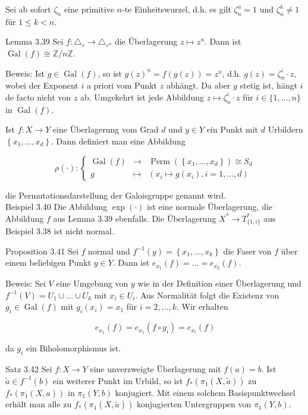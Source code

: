 \documentclass[10pt, letterpaper]{article}
\begin{document}
Sei ab sofort $\zeta_{n}$ eine primitive $n$-te Einheitswurzel, d.h. es gilt $\zeta_{n}^{n}=1$ und $\zeta_{n}^{k} \neq 1$ für $1 \leq k<n$.

Lemma 3.39 Sei $f: \triangle_{\varepsilon} \rightarrow \triangle_{\varepsilon^{n}}$ die Überlagerung $z \mapsto z^{n}$. Dann ist $\operatorname{Gal}(f) \cong \mathbb{Z} / n \mathbb{Z}$.

Beweis: Ist $g \in \operatorname{Gal}(f)$, so ist $g(z)^{n}=f(g(z))=z^{n}$, d.h. $g(z)=\zeta_{n}^{i} \cdot z$, wobei der Exponent $i$ a priori vom Punkt $z$ abhängt. Da aber $g$ stetig ist, hängt $i$ de facto nicht von $z$ ab. Umgekehrt ist jede Abbildung $z \mapsto \zeta_{n}^{i} \cdot z$ für $i \in\{1, \ldots, n\}$ in $\operatorname{Gal}(f)$.

Ist $f: X \rightarrow Y$ eine Überlagerung vom Grad $d$ und $y \in Y$ ein Punkt mit $d$ Urbildern $\left\{x_{1}, \ldots, x_{d}\right\}$. Dann definiert man eine Abbildung

$$
\rho(\cdot):\left\{\begin{array}{ccc}
\operatorname{Gal}(f) & \longrightarrow & \operatorname{Perm}\left(\left\{x_{1}, \ldots, x_{d}\right\}\right) \cong S_{d} \\
g & \longmapsto & \left(x_{i} \mapsto g\left(x_{i}\right), i=1, \ldots, d\right)
\end{array}\right.
$$

die Permutationsdarstellung der Galoisgruppe genannt wird.\\
Beispiel 3.40 Die Abbildung $\exp (\cdot)$ ist eine normale Überlagerung, die Abbildung $f$ aus Lemma 3.39 ebenfalls. Die Überlagerung $X^{*} \rightarrow T_{\{1, i\}}^{*}$ aus Beispiel 3.38 ist nicht normal.

Proposition 3.41 Sei $f$ normal und $f^{-1}(y)=\left\{x_{1}, \ldots, x_{k}\right\}$ die Faser von $f$ über einem beliebigen Punkt $y \in Y$. Dann ist $e_{x_{1}}(f)=\ldots=e_{x_{k}}(f)$.

Beweis: Sei $V$ eine Umgebung von $y$ wie in der Definition einer Überlagerung und $f^{-1}(V)=U_{1} \cup \ldots \cup U_{k}$ mit $x_{i} \in U_{i}$. Aus Normalität folgt die Existenz von $g_{i} \in \operatorname{Gal}(f)$ mit $g_{i}\left(x_{i}\right)=x_{1}$ für $i=2, \ldots, k$. Wir erhalten

$$
e_{x_{1}}(f)=e_{x_{1}}\left(f \circ g_{i}\right)=e_{x_{i}}(f)
$$

da $g_{i}$ ein Biholomorphismus ist.

Satz 3.42 Sei $f: X \rightarrow Y$ eine unverzweigte Überlagerung mit $f(a)=b$. Ist $\widetilde{a} \in f^{-1}(b)$ ein weiterer Punkt im Urbild, so ist $f_{*}\left(\pi_{1}(X, \widetilde{a})\right)$ zu $f_{*}\left(\pi_{1}(X, a)\right)$ in $\pi_{1}(Y, b)$ konjugiert. Mit einem solchem Basispunktwechsel erhält man alle zu $f_{*}\left(\pi_{1}(X, \widetilde{a})\right)$ konjugierten Untergruppen von $\pi_{1}(Y, b)$.
\end{document}
